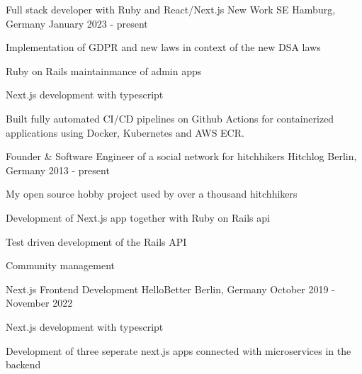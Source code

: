 

\begin{cventries}
  \cventry
    {Full stack developer with Ruby and React/Next.js} %
    {New Work SE} %
    {Hamburg, Germany} %
    {January 2023 - present} %
    {
      \begin{cvitems} %
        \item {Implementation of GDPR and new laws in context of the new DSA laws}
        \item {Ruby on Rails maintainmance of admin apps}
        \item {Next.js development with typescript}
        \item {Built fully automated CI/CD pipelines on Github Actions for containerized applications using Docker, Kubernetes and AWS ECR.}
      \end{cvitems}
    }

  \cventry
    {Founder \& Software Engineer of a social network for hitchhikers} %
    {Hitchlog} %
    {Berlin, Germany} %
    {2013 - present} %
    {
      \begin{cvitems} %
        \item {My open source hobby project used by over a thousand hitchhikers}
        \item {Development of Next.js app together with Ruby on Rails api}
        \item {Test driven development of the Rails API}
        \item {Community management}
      \end{cvitems}
    }

  \cventry
    {Next.js Frontend Development} %
    {HelloBetter} %
    {Berlin, Germany} %
    {October 2019 - November 2022} %
    {
      \begin{cvitems} %
        \item {Next.js development with typescript}
        \item {Development of three seperate next.js apps connected with microservices in the backend}
      \end{cvitems}
    }


\end{cventries}
